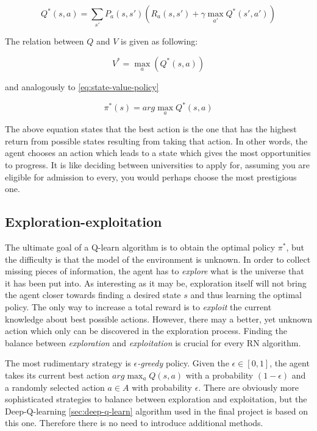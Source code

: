 \begin{equation}
    Q^{*}(s, a) = \sum_{s'} P_a(s, s') \left(R_a(s, s') + \gamma \max_{a'} Q^{*}(s', a') \right)
\label{eq:q-value}
\end{equation}

The relation between $Q$ and $V$ is given as following:

\begin{equation}
    V^{*} = \max_a \left(Q^{*} (s, a)\right)
\end{equation}

and analogously to \ref{eq:state-value-policy}

\begin{equation}
    \pi^{*}(s) = arg \max_a Q^{*}(s, a)
\end{equation}

The above equation states that the best action is the one that has the highest return from possible states resulting from taking that action.
In other words, the agent chooses an action which leads to a state which gives the most opportunities to progress. It is like deciding between universities to apply for, assuming you are eligible for admission to every, you would perhaps choose the most prestigious one.

\subsection{Exploration-exploitation}
\label{sub:exploration-exploitation}

The ultimate goal of a Q-learn algorithm is to obtain the optimal policy $\pi^{*}$, but the difficulty is that the model of the environment is unknown. In order to collect missing pieces of information, the agent has to \emph{explore} what is the universe that it has been put into. As interesting as it may be, exploration itself will not bring the agent closer towards finding a desired state $s$ and thus learning the optimal policy. The only way to increase a total reward is to \emph{exploit} the current knowledge about best possible actions. However, there may a better, yet unknown action which only can be discovered in the exploration process. Finding the balance between \emph{exploration} and \emph{exploitation} is crucial for every RN algorithm.

The most rudimentary strategy is \emph{$\epsilon$-greedy} policy. Given the $\epsilon \in [0, 1]$, the agent takes its current best action $arg\max_a Q(s, a)$ with a probability $(1 - \epsilon)$ and a randomly selected action $a \in A$ with probability $\epsilon$. There are obviously more sophisticated strategies to balance between exploration and exploitation, but the Deep-Q-learning \ref{sec:deep-q-learn} algorithm used in the final project is based on this one. Therefore there is no need to introduce additional methods.

